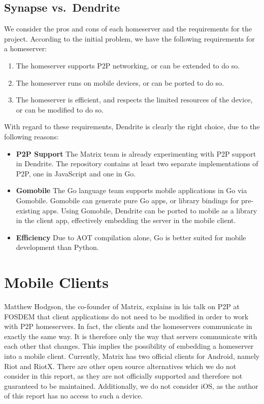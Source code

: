 \subsection{Synapse vs.~Dendrite}\label{sec:synapse_vs_dendrite}
We consider the pros and cons of each homeserver and the requirements for the project.
According to the initial problem, we have the following requirements for a homeserver:
\begin{enumerate}
      \item{
            The homeserver supports \ac{P2P} networking, or can be extended to do so.
            }
      \item{
            The homeserver runs on mobile devices, or can be ported to do so.
            }
      \item{
            The homeserver is efficient, and respects the limited resources of the device, or can be modified to do so.
            }
\end{enumerate}
With regard to these requirements, Dendrite is clearly the right choice, due to the following reasons:
\begin{itemize}
      \item{
            \textbf{\ac{P2P} Support}
            The Matrix team is already experimenting with \ac{P2P} support in Dendrite.
            The repository contains at least two separate implementations of \ac{P2P}, one in JavaScript and one in Go\cite{fosdem_event_p2p_matrix}.
            }
      \item{
            \textbf{Gomobile}
            The Go language team supports mobile applications in Go via Gomobile\cite{gomobile}.
            Gomobile can generate pure Go apps, or library bindings for pre-existing apps.
            Using Gomobile, Dendrite can be ported to mobile as a library in the client app, effectively embedding the server in the mobile client.
            }
      \item{
            \textbf{Efficiency}
            Due to \ac{AOT} compilation alone, Go is better suited for mobile development than Python.
            }
\end{itemize}

\section{Mobile Clients}\label{sec:official_clients}
Matthew Hodgson, the co-founder of Matrix, explains in his talk on \ac{P2P} at FOSDEM\cite{fosdem_event_p2p_matrix} that client applications do not need to be modified in order to work with \ac{P2P} homeservers.
In fact, the clients and the homeservers communicate in exactly the same way.
It is therefore only the way that servers communicate with each other that changes.
This implies the possibility of embedding a homeserver into a mobile client.
Currently, Matrix has two official clients for Android, namely Riot and RiotX.
There are other open source alternatives which we do not consider in this report, as they are not officially supported and therefore not guaranteed to be maintained.
Additionally, we do not consider iOS, as the author of this report has no access to such a device.

